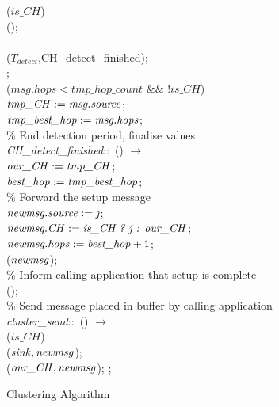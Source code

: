 \begin{figure}[H]
\begin{boxedminipage}{\linewidth}
    \null\qq\qq\qq {} ($is\_CH$)  \\
    \null\qq\qq\qq\qq {}(); \\
    \null\qq\qq\qq {}\\
    \null\qq\qq\qq\qq {}($T_{detect}$,CH\_detect\_finished); \\
    \null\qq\qq {}; \\
    \null\qq\qq {} ($msg.hops < tmp\_hop\_count$ \&\& !$is\_CH$)  \\
    \null\qq\qq\qq $\mbox{\emph{tmp\_CH}} \mathrel{:=} \mbox{\emph{msg.source}}$;\\
    \null\qq\qq\qq $\mbox{\emph{tmp\_best\_hop}} \mathrel{:=} \mbox{\emph{msg.hops}}$;\\
    \null\qq \% End detection period, finalise values\\
    \null\qq \emph{CH\_detect\_finished}::~() $\rightarrow$\\
    \null\qq\qq $\mbox{\emph{our\_CH}} \mathrel{:=} \mbox{\emph{tmp\_CH}}$;\\
    \null\qq\qq $\mbox{\emph{best\_hop}} \mathrel{:=} \mbox{\emph{tmp\_best\_hop}}$;\\
    \null\qq\qq \% Forward the setup message\\
    \null\qq\qq $\var{newmsg.source} \assign \var{\j}$;\\
    \null\qq\qq $\mbox{\emph{newmsg.CH}} \mathrel{:=} \mbox{\emph{is\_CH ? j : our\_CH}}$;\\
    \null\qq\qq $\mbox{\emph{newmsg.hops}} \mathrel{:=} \mbox{\emph{best\_hop}}+1$;\\
    \null\qq\qq {}($\mbox{\emph{newmsg}}$);\\
    \null\qq\qq \% Inform calling application that setup is complete\\
    \null\qq\qq {}();\\
    \null\qq \% Send message placed in buffer by calling application\\
	\null\qq \emph{cluster\_send}::~() $\rightarrow$\\
    \null\qq\qq {} ($is\_CH$)  \\
    \null\qq\qq\qq {}($\mbox{\emph{sink}}, \mbox{\emph{newmsg}}$);
    \null\qq\qq {}\\    
    \null\qq\qq\qq {}($\mbox{\emph{our\_CH}}, \mbox{\emph{newmsg}}$);
    \null\qq\qq {}; \\
  \end{boxedminipage}
  \caption{Clustering Algorithm}
\end{figure}

